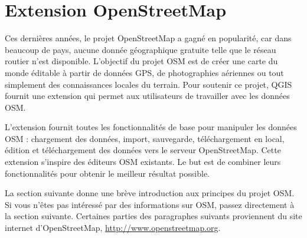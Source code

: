 
\section{Extension OpenStreetMap}\label{plugins_osm}


Ces dernières années, le projet OpenStreetMap a gagné en popularité, car dans beaucoup de pays, aucune donnée géographique gratuite telle que le réseau routier n'est disponible. L'objectif du projet OSM est de créer une carte du monde éditable à partir de données GPS, de photographies aériennes ou tout simplement des connaissances locales du terrain. Pour soutenir ce projet, QGIS fournit une extension qui permet aux utilisateurs de travailler avec les données OSM.

L'extension fournit toutes les fonctionnalités de base pour manipuler les données OSM : chargement des données, import, sauvegarde, téléchargement en local, édition et téléchargement des données vers le serveur OpenStreetMap. Cette extension s'inspire des éditeurs OSM existants. Le but est de combiner leurs fonctionnalités pour obtenir le meilleur résultat possible.

La section suivante donne une brève introduction aux principes du projet OSM. Si vous n'êtes pas intéressé par des informations sur OSM, passez directement à la section suivante. Certaines parties des paragraphes suivants proviennent du site internet d'OpenStreetMap, \url{http://www.openstreetmap.org}.

